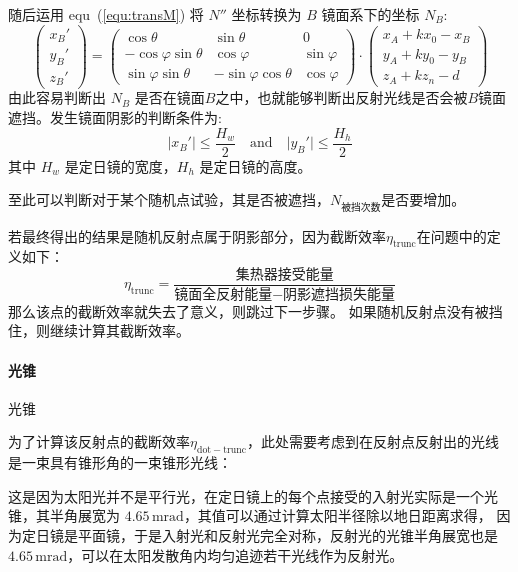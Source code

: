 \documentclass[../main.tex]{subfiles}
\begin{document}
随后运用 equ~(\ref{equ:transM}) 将 \(N''\) 坐标转换为 \(B\) 镜面系下的坐标 \(N_{B}\):
\[
\begin{pmatrix}
x_{B} '\\
y_{B} '\\
z _{B} '
\end{pmatrix}
=
\begin{pmatrix}
\cos \theta & \sin \theta & 0\\
-\cos \varphi \sin \theta & \cos \varphi & \sin \varphi \\
\sin \varphi \sin \theta & - \sin \varphi \cos \theta & \cos \varphi
\end{pmatrix}
\cdot
\begin{pmatrix}
x_{A} + kx_0 - x_{B}\\
y_{A} + ky_{0} - y_{B}\\
z_{A} + kz_{n} - d
\end{pmatrix}
\]
由此容易判断出 \(N_{B}\) 是否在镜面\(B\)之中，也就能够判断出反射光线是否会被\(B\)镜面遮挡。发生镜面阴影的判断条件为:
\begin{equation}
\vert x_{B}' \vert \le \frac{H_{w}}{2}\quad \text{and} \quad \vert y_{B}' \vert \le \frac{H_{h}}{2}
\end{equation}
其中 \(H_{w}\) 是定日镜的宽度，\(H_{h}\) 是定日镜的高度。

至此可以判断对于某个随机点试验，其是否被遮挡，\(N_{\text{被挡次数}}\)是否要增加。

若最终得出的结果是随机反射点属于阴影部分，因为截断效率\(\eta _{\mathrm{trunc}}\)在问题中的定义如下：
\begin{equation}
\eta _{\mathrm{trunc}} = \frac{\text{集热器接受能量}}{\text{镜面全反射能量} - \text{阴影遮挡损失能量}}
\end{equation}
那么该点的截断效率就失去了意义，则跳过下一步骤。
如果随机反射点没有被挡住，则继续计算其截断效率。

\paragraph{光锥} 光锥

为了计算该反射点的截断效率\(\eta _{\mathrm{dot}{-}\mathrm{trunc}}\)，此处需要考虑到在反射点反射出的光线是一束具有锥形角的一束锥形光线：

这是因为太阳光并不是平行光，在定日镜上的每个点接受的入射光实际是一个光锥，其半角展宽为 \(4.65 \, \mathrm{m}\mathrm{rad}\)，其值可以通过计算太阳半径除以地日距离求得，%
因为定日镜是平面镜，于是入射光和反射光完全对称，反射光的光锥半角展宽也是 \(4.65\, \mathrm{mrad}\)，可以在太阳发散角内均匀追迹若干光线作为反射光。
\end{document}
